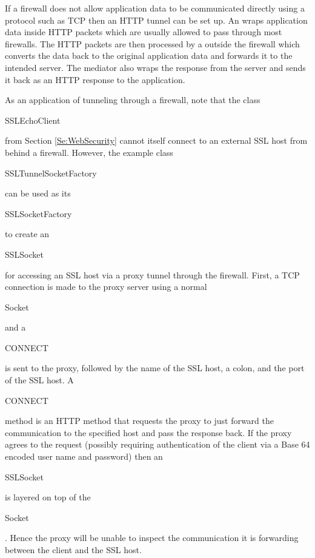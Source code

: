 If a firewall does not allow application data to be communicated directly
using a protocol such as TCP then an HTTP tunnel can be set up.
An  wraps application data inside HTTP packets which are usually
allowed to pass through most firewalls.
The HTTP packets are then processed by a  outside the firewall
which converts the data back to the original application data and forwards
it to the intended server. The mediator also wraps the response from the server
and sends it back as an HTTP response to the application.

As an application of tunneling through a firewall, note that
the class \begin{code}SSL\-EchoClient\end{code} from Section \ref{Se:WebSecurity}
cannot itself connect to an external SSL host from behind a firewall.
However, the example class \begin{code}SSLTunnelSocketFactory\end{code} can
be used as its \begin{code}SSLSocketFactory\end{code} to create an
\begin{code}SSLSocket\end{code} for accessing an SSL host via a proxy tunnel
through the firewall.
First, a TCP connection is made to the proxy server using a normal \begin{code}Socket\end{code}
and a \begin{code}CONNECT\end{code} is sent to the proxy,
followed by the name of the SSL host, a colon, and the port of the SSL host.
A \begin{code}CONNECT\end{code} method is an HTTP method that requests the proxy
to just forward the communication to the specified host and pass the response back.
If the proxy agrees to the request (possibly requiring authentication of the client
via a Base 64 encoded user name and password) then an \begin{code}SSLSocket\end{code} is
layered on top of the \begin{code}Socket\end{code}.
Hence the proxy will be unable to inspect the communication it is forwarding
between the client and the SSL host.

